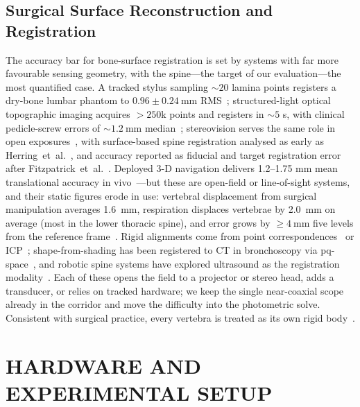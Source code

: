 \documentclass[conference]{IEEEtran}
\begin{document}
\subsection{Surgical Surface Reconstruction and Registration}
The accuracy bar for bone-surface registration is set by systems with
far more favourable sensing geometry, with the spine---the target of our
evaluation---the most quantified case.  A tracked stylus sampling ${\sim}20$ lamina
points registers a dry-bone lumbar phantom to
$0.96\pm\SI{0.24}{\milli\meter}$ RMS~\cite{tamura2005}; structured-light
optical topographic imaging acquires ${>}250$k points and registers in
${\sim}5$ s, with clinical pedicle-screw errors of
${\sim}\SI{1.2}{\milli\meter}$ median~\cite{jakubovic2018}; stereovision
serves the same role in open exposures~\cite{ji2015}, with surface-based
spine registration analysed as early as
Herring~et~al.~\cite{herring1998}, and accuracy reported as fiducial and
target registration error after
Fitzpatrick~et~al.~\cite{fitzpatrick1998}.  Deployed 3-D navigation
delivers 1.2--1.75 mm mean translational accuracy in
vivo~\cite{guha2017}---but these are open-field or line-of-sight systems,
and their static figures erode in use: vertebral displacement from
surgical manipulation averages \SI{1.6}{\milli\meter}, respiration displaces
vertebrae by \SI{2.0}{\milli\meter} on average (most in the lower
thoracic spine), and error grows by
${\ge}\SI{4}{\milli\meter}$ five levels from the reference
frame~\cite{guha2019}.  Rigid alignments come from point
correspondences~\cite{kabsch1976,umeyama1991} or ICP~\cite{besl1992};
shape-from-shading has been registered to CT in bronchoscopy via
pq-space~\cite{deligianni2003pq}, and robotic spine systems have explored
ultrasound as the registration modality~\cite{li2024ultrasound}.  Each of
these opens the field to a projector or stereo head, adds a transducer,
or relies on tracked hardware; we keep the single near-coaxial scope
already in the corridor and move the difficulty into the photometric
solve.  Consistent with surgical practice, every vertebra is treated as
its own rigid body~\cite{herring1998}.

\section{HARDWARE AND EXPERIMENTAL SETUP}\label{sec:rig}
\end{document}
